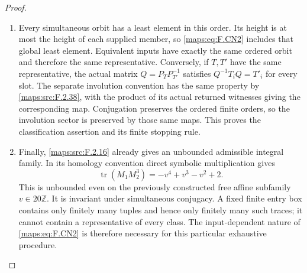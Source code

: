 \begin{proof}
\begin{enumerate}[label=\arabic*.]
\item Every simultaneous orbit has a least element in this order.
Its height is at most the height of each supplied member, so
\eqref{maps:eq:F.CN2} includes that global least element.
Equivalent inputs have exactly the same ordered orbit and
therefore the same representative. Conversely, if $T,T'$ have
the same representative, the actual matrix
$Q=P_TP_{T'}^{-1}$ satisfies $Q^{-1}T_iQ=T'_i$ for every slot.
The separate involution convention has the same property by
\cref{maps:src:F.2.38}, with the product of its actual returned
witnesses giving the corresponding map. Conjugation preserves
the ordered finite orders, so the involution sector is preserved
by those same maps. This proves the classification assertion
and its finite stopping rule.

\item Finally, \ref{maps:src:F.2.16} already gives an unbounded admissible integral
family. In its homology convention direct symbolic
multiplication gives
\[
             \operatorname{tr}(M_1M_2^3)
                       =-v^4+v^3-v^2+2.                 \tag{F.CN3}\label{maps:eq:F.CN3}
\]
This is unbounded even on the previously constructed free
affine subfamily $v\in20\mathbb Z$. It is invariant under
simultaneous conjugacy. A fixed finite entry box contains
only finitely many tuples and hence only finitely many such
traces; it cannot contain a representative of every class.
The input-dependent nature of \eqref{maps:eq:F.CN2} is therefore necessary
for this particular exhaustive procedure.

\end{enumerate}
\end{proof}




